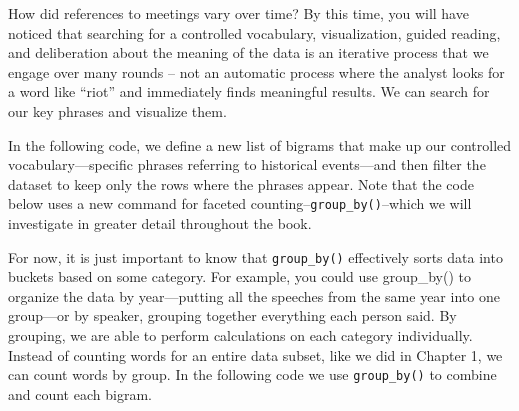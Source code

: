 \documentclass[
]{article}
\begin{document}
How did references to meetings vary over time? By this time, you will
have noticed that searching for a controlled vocabulary, visualization,
guided reading, and deliberation about the meaning of the data is an
iterative process that we engage over many rounds -- not an automatic
process where the analyst looks for a word like ``riot'' and immediately
finds meaningful results. We can search for our key phrases and
visualize them.

In the following code, we define a new list of bigrams that make up our
controlled vocabulary---specific phrases referring to historical
events---and then filter the dataset to keep only the rows where the
phrases appear. Note that the code below uses a new command for faceted
counting--\texttt{group\_by()}--which we will investigate in greater
detail throughout the book.

For now, it is just important to know that \texttt{group\_by()}
effectively sorts data into buckets based on some category. For example,
you could use group\_by() to organize the data by year---putting all the
speeches from the same year into one group---or by speaker, grouping
together everything each person said. By grouping, we are able to
perform calculations on each category individually. Instead of counting
words for an entire data subset, like we did in Chapter 1, we can count
words by group. In the following code we use \texttt{group\_by()} to
combine and count each bigram.
\end{document}
